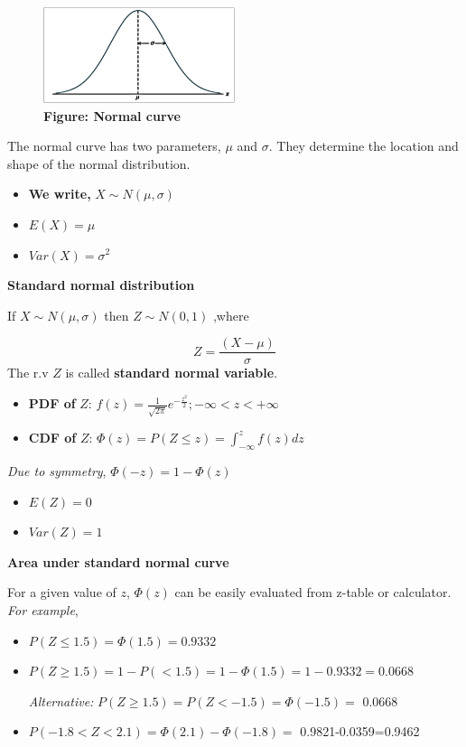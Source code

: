 \documentclass[
]{article}
\providecommand{\tightlist}{%
  \setlength{\itemsep}{0pt}\setlength{\parskip}{0pt}}
\begin{document}
\begin{figure}
\centering
\includegraphics[width=0.5\textwidth,height=\textheight]{Normal_curve.png}
\caption{\textbf{Figure: Normal curve}}
\end{figure}

The normal curve has two parameters, \(\mu\) and \(\sigma\). They determine the location and shape of the normal distribution.

\begin{itemize}
\tightlist
\item
  \textbf{We write,} \(X\sim N(\mu,\sigma)\)
\item
  \(E(X)=\mu\)
\item
  \(Var(X)=\sigma^2\)
\end{itemize}

\textbf{Standard normal distribution}

If \(X\sim N(\mu,\sigma)\) then \(Z\sim N(0,1)\) ,where

\[Z=\frac{(X-\mu)}{\sigma}\] The r.v \(Z\) is called \textbf{standard normal variable}.

\begin{itemize}
\item
  \textbf{PDF of} \(Z\): \(f(z)=\frac{1}{\sqrt{2\pi}}e^{-\frac{z^2}{2}};-\infty<z<+\infty\)
\item
  \textbf{CDF of} \(Z\): \(\Phi(z)=P(Z\le z)=\int_{-\infty}^{z}f(z)dz\)
\end{itemize}

\emph{Due to symmetry}, \(\Phi(-z)=1-\Phi(z)\)

\begin{itemize}
\item
  \(E(Z)=0\)
\item
  \(Var(Z)=1\)
\end{itemize}

\textbf{Area under standard normal curve}

For a given value of \(z\), \(\Phi(z)\) can be easily evaluated from z-table or calculator. \emph{For example},

\begin{itemize}
\item
  \(P(Z\le 1.5)=\Phi(1.5)=0.9332\)
\item
  \(P(Z\ge 1.5)=1-P(<1.5)=1-\Phi(1.5)=1-0.9332=0.0668\)

  \emph{Alternative:} \(P(Z\ge 1.5)=P(Z< -1.5)=\Phi(-1.5)=\) 0.0668
\item
  \(P(-1.8<Z<2.1)=\Phi(2.1)-\Phi(-1.8)=\) 0.9821-0.0359=0.9462
\end{itemize}
\end{document}
